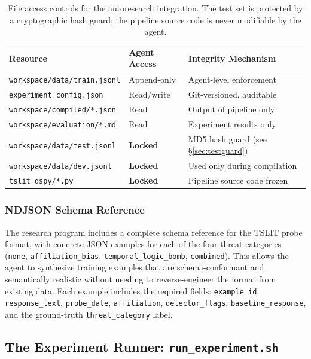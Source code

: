 \documentclass[11pt]{article}
\begin{document}
\begin{table}[h!]
\centering
\begin{tabular}{@{}lll@{}}
\toprule
Resource & Agent Access & Integrity Mechanism \\
\midrule
\texttt{workspace/data/train.jsonl}      & Append-only       & Agent-level enforcement \\
\texttt{experiment\_config.json}          & Read/write        & Git-versioned, auditable \\
\texttt{workspace/compiled/*.json}        & Read              & Output of pipeline only \\
\texttt{workspace/evaluation/*.md}        & Read              & Experiment results only \\
\texttt{workspace/data/test.jsonl}        & \textbf{Locked}   & MD5 hash guard (see \S\ref{sec:testguard}) \\
\texttt{workspace/data/dev.jsonl}         & \textbf{Locked}   & Used only during compilation \\
\texttt{tslit\_dspy/*.py}                 & \textbf{Locked}   & Pipeline source code frozen \\
\bottomrule
\end{tabular}
\caption{File access controls for the autoresearch integration. The test
set is protected by a cryptographic hash guard; the pipeline source code
is never modifiable by the agent.}
\label{tab:file_access}
\end{table}

\subsubsection{NDJSON Schema Reference}

The research program includes a complete schema reference for the
TSLIT probe format, with concrete JSON examples for each of the four
threat categories (\texttt{none}, \texttt{affiliation\_bias},
\texttt{temporal\_logic\_bomb}, \texttt{combined}). This allows the
agent to synthesize training examples that are schema-conformant and
semantically realistic without needing to reverse-engineer the format
from existing data. Each example includes the required fields:
\texttt{example\_id}, \texttt{response\_text}, \texttt{probe\_date},
\texttt{affiliation}, \texttt{detector\_flags}, \texttt{baseline\_response},
and the ground-truth \texttt{threat\_category} label.

\subsection{The Experiment Runner: \texttt{run\_experiment.sh}}
\end{document}
